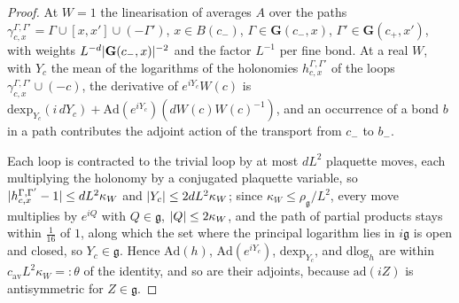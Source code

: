\documentclass[11pt]{preprint}
\DeclarePairedDelimiter{\abs}{\lvert}{\rvert}
\numberwithin{equation}{section}
\theoremstyle{definition}
\theoremstyle{remark}
\theoremstyle{plain}
\begin{document}
\begin{proof}
At $W = 1$ the linearisation of \cite[(0.4)]{BalabanRG1} averages $A$ over the paths $\gamma^{\Gamma,\Gamma'}_{c,x} = \Gamma \cup [x, x'] \cup (-\Gamma')$, $x \in B(c_-)$, $\Gamma \in \mathbf G(c_-, x)$, $\Gamma' \in \mathbf G(c_+, x')$, with weights $L^{-d}\abs{\mathbf G(c_-, x)}^{-2}$ and the factor $L^{-1}$ per fine bond. At a real $W$, with $Y_c$ the mean of the logarithms of the holonomies $h^{\Gamma,\Gamma'}_{c,x}$ of the loops $\gamma^{\Gamma,\Gamma'}_{c,x} \cup (-c)$, the derivative of $e^{iY_c}W(c)$ is $\mathrm{dexp}_{Y_c}(i\,dY_c) + \mathrm{Ad}(e^{iY_c})(dW(c)W(c)^{-1})$, and an occurrence of a bond $b$ in a path contributes the adjoint action of the transport from $c_-$ to $b_-$.

Each loop is contracted to the trivial loop by at most $dL^2$ plaquette moves, each multiplying the holonomy by a conjugated plaquette variable, so $\abs{h^{\Gamma,\Gamma'}_{c,x} - 1} \leq dL^2\kappa_W$ and $\abs{Y_c} \leq 2dL^2\kappa_W$; since $\kappa_W \leq \rho_{\mathfrak g}/L^2$, every move multiplies by $e^{iQ}$ with $Q \in \mathfrak g$, $\abs Q \leq 2\kappa_W$, and the path of partial products stays within $\frac1{16}$ of $1$, along which the set where the principal logarithm lies in $i\mathfrak g$ is open and closed, so $Y_c \in \mathfrak g$. Hence $\mathrm{Ad}(h)$, $\mathrm{Ad}(e^{iY_c})$, $\mathrm{dexp}_{Y_c}$, and $\mathrm{dlog}_h$ are within $c_{\mathrm{av}}L^2\kappa_W =: \theta$ of the identity, and so are their adjoints, because $\mathrm{ad}(iZ)$ is antisymmetric for $Z \in \mathfrak g$.


\end{proof}
\end{document}
